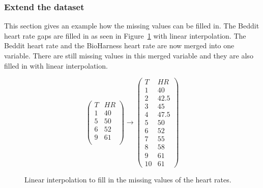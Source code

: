 		\subsubsection{Extend the dataset}
			\label{sec:extendeddataset}
			This section gives an example how the missing values can be filled in.	The Beddit heart rate gaps are filled in as seen in Figure~\ref{fig:lin} with linear interpolation. The Beddit heart rate and the BioHarness heart rate are now merged into one variable. There are still missing values in this merged variable and they are also filled in with linear interpolation.

			\begin{figure}[h!]
			\[ 
				\left(
				\begin{array}{rr}
				T & HR \\ \hline
				1 & 40 \\
				5 & 50 \\
				6 & 52 \\
				9 & 61 \\
				\end{array}
				\right)
				\to
				\left(
				\begin{array}{rl}
				T & HR \\ \hline
				1 & 40 \\
				2 & 42.5 \\
				3 & 45 \\
				4 & 47.5 \\
				5 & 50 \\
				6 & 52 \\
				7 & 55 \\
				8 & 58 \\
				9 & 61 \\
				10 & 61
				\end{array}
				\right)
			\] 
			\caption{Linear interpolation to fill in the missing values of the heart rates.}
			\label{fig:lin}
		\end{figure}
		
